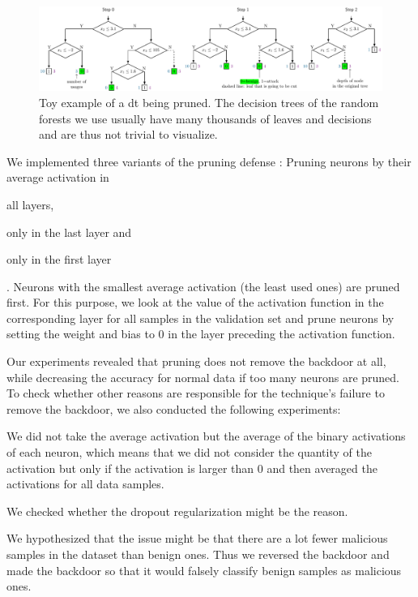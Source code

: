 \documentclass[9pt,sigconf,letterpaper,dvipsnames\ifx\removeHeaders\tempYes ,nonacm\fi]{acmart}
\begin{document}
\begin{figure}[h]
\includegraphics[width=\textwidth]{pruning_example.pdf}
\caption{Toy example of a \gls{dt} being pruned. The decision trees of the random forests we use usually have many thousands of leaves and decisions and are thus not trivial to visualize.}
\label{fig:pruningExample}
\end{figure}


We implemented three variants of the pruning defense \cite{gu_badnets:_2017}: Pruning neurons by their average activation in \begin{enumerate*}\item all layers, \item only in the last layer and \item only in the first layer \end{enumerate*}. Neurons with the smallest average activation (the least used ones) are pruned first. For this purpose, we look at the value of the activation function
in the corresponding layer for all samples in the validation set and prune neurons by setting the weight and bias to 0 in the layer preceding the activation function.

Our experiments revealed that pruning does not remove the backdoor at all, while decreasing the accuracy for normal data if too many neurons are pruned. To check whether other reasons are responsible for the technique's failure to remove the backdoor, we also conducted the following experiments: \begin{enumerate*} \item We did not take the average activation but the average of the binary activations of each neuron, which means that we did not consider the quantity of the activation but only if the activation is larger than 0 and then averaged the activations for all data samples. \item We checked whether the dropout regularization might be the reason. \item We hypothesized that the issue might be that there are a lot fewer malicious samples in the dataset than benign ones. Thus we reversed the backdoor and made the backdoor so that it would falsely classify benign samples as malicious ones.
\end{enumerate*}
\end{document}

